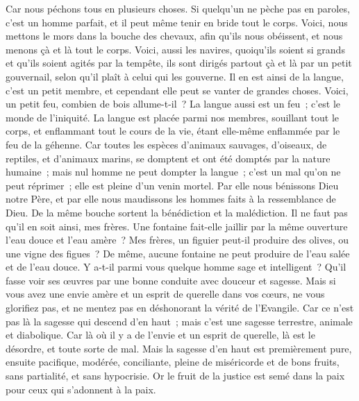 \begin{multicols}{2}
Car nous péchons tous en plusieurs choses. Si quelqu'un ne pèche pas en paroles, c'est un homme parfait, et il peut même tenir en bride tout le corps.
Voici, nous mettons le mors dans la bouche des chevaux, afin qu'ils nous obéissent, et nous menons çà et là tout le corps.
Voici, aussi les navires, quoiqu'ils soient si grands et qu'ils soient agités par la tempête, ils sont dirigés partout çà et là par un petit gouvernail, selon qu'il plaît à celui qui les gouverne.
Il en est ainsi de la langue, c'est un petit membre, et cependant elle peut se vanter de grandes choses. Voici, un petit feu, combien de bois allume-t-il~?
La langue aussi est un feu~; c'est le monde de l'iniquité. La langue est placée parmi nos membres, souillant tout le corps, et enflammant tout le cours de la vie, étant elle-même enflammée par le feu de la géhenne.
Car toutes les espèces d'animaux sauvages, d'oiseaux, de reptiles, et d'animaux marins, se domptent et ont été domptés par la nature humaine~;
mais nul homme ne peut dompter la langue~; c'est un mal qu'on ne peut réprimer~; elle est pleine d'un venin mortel.
Par elle nous bénissons Dieu notre Père, et par elle nous maudissons les hommes faits à la ressemblance de Dieu.
De la même bouche sortent la bénédiction et la malédiction. Il ne faut pas qu'il en soit ainsi, mes frères.
Une fontaine fait-elle jaillir par la même ouverture l'eau douce et l'eau amère~?
Mes frères, un figuier peut-il produire des olives, ou une vigne des figues~? De même, aucune fontaine ne peut produire de l'eau salée et de l'eau douce.
Y a-t-il parmi vous quelque homme sage et intelligent~? Qu'il fasse voir ses œuvres par une bonne conduite avec douceur et sagesse.
Mais si vous avez une envie amère et un esprit de querelle dans vos cœurs, ne vous glorifiez pas, et ne mentez pas en déshonorant la vérité de l'Evangile.
Car ce n'est pas là la sagesse qui descend d'en haut~; mais c'est une sagesse terrestre, animale et diabolique.
Car là où il y a de l'envie et un esprit de querelle, là est le désordre, et toute sorte de mal.
Mais la sagesse d'en haut est premièrement pure, ensuite pacifique, modérée, conciliante, pleine de miséricorde et de bons fruits, sans partialité, et sans hypocrisie.
Or le fruit de la justice est semé dans la paix pour ceux qui s'adonnent à la paix.

\end{multicols}
